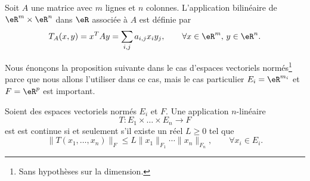 \begin{example}
  Soit $A$ une matrice avec $m$ lignes et $n$ colonnes. L'application bilinéaire de $\eR^m\times \eR^n$ dans $\eR$ associée à $A$ est définie par
\[
T_A(x,y)= x^TAy=\sum_{i,j}a_{i,j}x_i y_j, \qquad \forall x\in \eR^m, \, y \in \eR^n.
\]
\end{example}

Nous énonçons la proposition suivante dans le cas d'espaces vectoriels normés\footnote{Sans hypothèses sur la dimension.} parce que nous allons l'utiliser dans ce cas, mais le cas particulier \( E_i=\eR^{m_i}\) et \( F=\eR^p\) est important.
\begin{proposition} \label{PropUADlSMg}
    Soient des espaces vectoriels normés \( E_i\) et \( F\). Une application \( n\)-linéaire
    \begin{equation}
        T\colon E_1\times\ldots\times E_n\to F
    \end{equation}
    est est continue si et seulement s'il existe un réel $L\geq 0$ tel que
  \begin{equation}\label{limitatezza}
     \|T(x_1, \ldots,x_n)\|_F\leq L \|x_1\|_{F_1}\cdots\|x_n\|_{F_n}, \qquad \forall x_i\in E_i.
  \end{equation}
\end{proposition}

